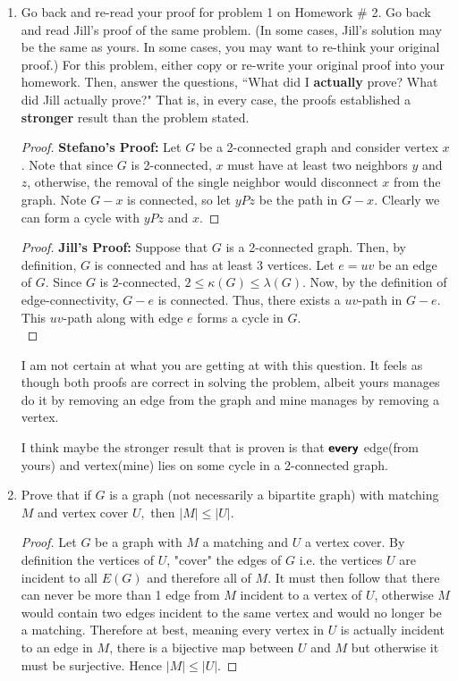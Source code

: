 \documentclass[12pt]{article}
\renewcommand{\emph}[1]{\textsf{\textbf{#1}}}
\begin{document}
\begin{enumerate}

	\item Go back and re-read your proof for problem 1 on Homework \# 2. Go back and read Jill's proof of the same problem. (In some cases, Jill's solution may be the same as yours. In some cases, you may want to re-think your original proof.) For this problem, either copy or re-write your original proof into your homework. Then, answer the questions, ``What did I \emph{actually} prove? What did Jill actually prove?" That is, in every case, the proofs established a \emph{stronger} result than the problem stated.
	

	\begin{proof}
		\textbf{Stefano's Proof:} Let $G$ be a 2-connected graph and consider vertex $x$. Note that since $G$ is 2-connected, $x$ must have at least two neighbors $y$ and $z$, otherwise, the removal of the single neighbor would disconnect $x$ from the graph. Note $G - x$ is connected, so let $yPz$ be the path in $G - x$. Clearly we can form a cycle with $yPz$ and $x$. 
	\end{proof}



	\begin{proof}
		\textbf{Jill's Proof:}  Suppose that $G$ is a 2-connected graph. Then, by definition, $G$ is connected and has at least 3 vertices. Let $e=uv$ be an edge of $G$. Since $G$ is 2-connected, $2 \leq \kappa(G) \leq \lambda(G).$ Now, by the definition of edge-connectivity, $G-e$ is connected. Thus, there exists a $uv$-path in $G-e.$ This $uv$-path along with edge $e$ forms a cycle in $G.$\\
	\end{proof}

	I am not certain at what you are getting at with this question. It feels as though both proofs are correct in solving the problem, albeit yours manages do it by removing an edge from the graph and mine manages by removing a vertex. 

	I think maybe the stronger result that is proven is that $\emph{every}$ edge(from yours) and vertex(mine) lies on some cycle in a 2-connected graph.
	\newpage



	\item Prove that if $G$ is a graph (not necessarily a bipartite graph) with matching $M$ and vertex cover $U,$ then $|M|\leq |U|$.
	\begin{proof}  Let $G$ be a graph with $M$ a matching and $U$ a vertex cover. By definition the vertices of $U$, "cover" the edges of $G$ i.e. the vertices $U$ are incident to all $E(G)$ and therefore all of $M$. It must then follow that there can never be more than 1 edge from $M$ incident to a vertex of $U$, 
		otherwise $M$ would contain two edges incident to the same vertex and would no longer be a matching. 
		Therefore at best, meaning every vertex in $U$ is actually incident to an edge in $M$, there is a bijective map between $U$ and $M$ but otherwise it must be surjective. Hence $|M|\leq |U|$. 






\end{proof}
\end{enumerate}
\end{document}
